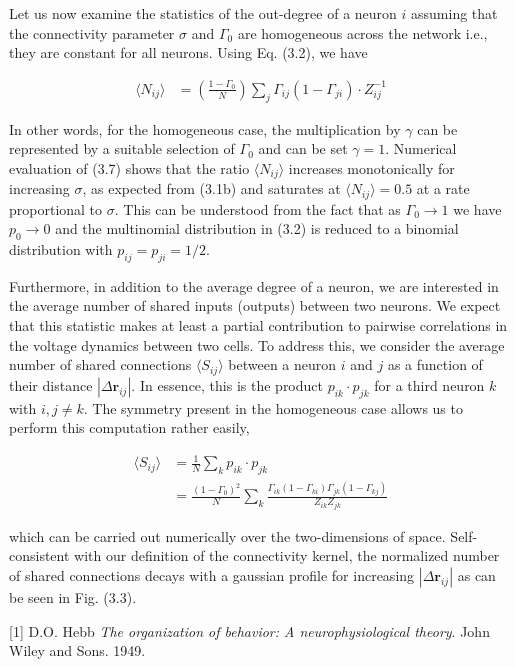 \documentclass{ucetd}
\begin{document}
Let us now examine the statistics of the out-degree of a neuron $i$ assuming that the connectivity parameter $\sigma$ and $\Gamma_{0}$ are homogeneous across the network i.e., they are constant for all neurons. Using Eq. (3.2), we have

\begin{align}
\langle N_{ij} \rangle &= \left(\frac{1-\Gamma_{0}}{N}\right)\sum_{j} \Gamma_{ij}(1-\Gamma_{ji})\cdot Z_{ij}^{-1}
\end{align}

In other words, for the homogeneous case, the multiplication by $\gamma$ can be represented by a suitable selection of $\Gamma_{0}$ and can be set $\gamma=1$. Numerical evaluation of (3.7) shows that the ratio $\langle N_{ij}\rangle$ increases monotonically for increasing $\sigma$, as expected from (3.1b) and saturates at $\langle N_{ij}\rangle = 0.5$ at a rate proportional to $\sigma$. This can be understood from the fact that as $\Gamma_{0} \rightarrow 1$ we have $p_{0} \rightarrow 0$ and the multinomial distribution in (3.2) is reduced to a binomial distribution with $p_{ij} = p_{ji} = 1/2$. 

Furthermore, in addition to the average degree of a neuron, we are interested in the average number of shared inputs (outputs) between two neurons. We expect that this statistic makes at least a partial contribution to pairwise correlations in the voltage dynamics between two cells. To address this, we consider the average number of shared connections $\langle S_{ij} \rangle$ between a neuron $i$ and $j$ as a function of their distance $|\Delta \mathbf{r}_{ij}|$. In essence, this is the product $p_{ik}\cdot p_{jk}$ for a third neuron $k$ with $i,j\neq k$. The symmetry present in the homogeneous case allows us to perform this computation rather easily,

\begin{align}
\langle S_{ij} \rangle &= \frac{1}{N}\sum_{k} p_{ik}\cdot p_{jk} \\
&= \frac{\left(1-\Gamma_{0}\right)^{2}}{N}\sum_{k}\frac{\Gamma_{ik}(1-\Gamma_{ki})\Gamma_{jk}(1-\Gamma_{kj})}{Z_{ik}Z_{jk}}
\end{align}


which can be carried out numerically over the two-dimensions of space. Self-consistent with our definition of the connectivity kernel, the normalized number of shared connections decays with a gaussian profile for increasing $|\Delta \mathbf{r}_{ij}|$ as can be seen in Fig. (3.3).

\makebibliography

[1] D.O. Hebb \textit{The organization of behavior: A neurophysiological theory}. John Wiley and Sons. 1949.

%
%
\end{document}
